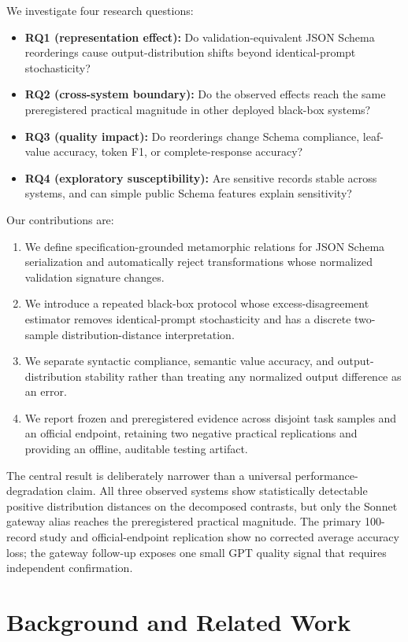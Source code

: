 \documentclass[10pt]{article}
\begin{document}
We investigate four research questions:

\begin{itemize}
\item \textbf{RQ1 (representation effect):} Do validation-equivalent JSON Schema reorderings cause output-distribution shifts beyond identical-prompt stochasticity?
\item \textbf{RQ2 (cross-system boundary):} Do the observed effects reach the same preregistered practical magnitude in other deployed black-box systems?
\item \textbf{RQ3 (quality impact):} Do reorderings change Schema compliance, leaf-value accuracy, token F1, or complete-response accuracy?
\item \textbf{RQ4 (exploratory susceptibility):} Are sensitive records stable across systems, and can simple public Schema features explain sensitivity?
\end{itemize}
Our contributions are:

\begin{enumerate}
\item We define specification-grounded metamorphic relations for JSON Schema serialization and automatically reject transformations whose normalized validation signature changes.
\item We introduce a repeated black-box protocol whose excess-disagreement estimator removes identical-prompt stochasticity and has a discrete two-sample distribution-distance interpretation.
\item We separate syntactic compliance, semantic value accuracy, and output-distribution stability rather than treating any normalized output difference as an error.
\item We report frozen and preregistered evidence across disjoint task samples and an official endpoint, retaining two negative practical replications and providing an offline, auditable testing artifact.
\end{enumerate}
The central result is deliberately narrower than a universal performance-degradation claim. All three observed systems show statistically detectable positive distribution distances on the decomposed contrasts, but only the Sonnet gateway alias reaches the preregistered practical magnitude. The primary 100-record study and official-endpoint replication show no corrected average accuracy loss; the gateway follow-up exposes one small GPT quality signal that requires independent confirmation.

\section{Background and Related Work}
\end{document}
